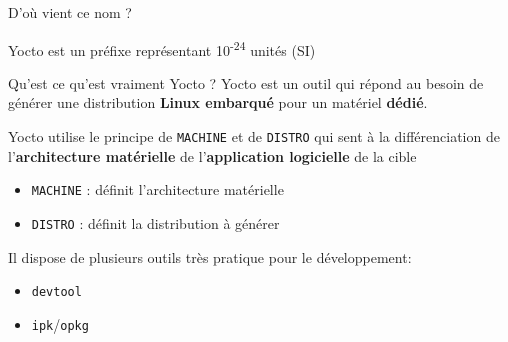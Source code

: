 \documentclass[compress]{beamer}
\begin{document}
\begin{frame}{D'où vient ce nom ?}
\begin{definition}
	Yocto est un préfixe représentant 10\textsuperscript{-24} unités (SI)
\end{definition}
\end{frame}

\begin{frame}
\begin{block}{Qu'est ce qu'est vraiment Yocto ?}
	Yocto est un outil qui répond au besoin de générer une distribution
	\textbf{Linux embarqué} pour un matériel \textbf{dédié}.
\end{block}
\end{frame}

\begin{frame}
Yocto utilise le principe de \texttt{MACHINE} et de \texttt{DISTRO} qui sent à la différenciation de l’\textbf{architecture matérielle} de l’\textbf{application logicielle} de la cible
\begin{itemize}
	\item \texttt{MACHINE} : définit l’architecture matérielle
	\item \texttt{DISTRO} : définit la distribution à générer
\end{itemize}
Il dispose de plusieurs outils très pratique pour le développement:
\begin{itemize}
	\item \texttt{devtool}
	\item \texttt{ipk}/\texttt{opkg}
\end{itemize}
\end{frame}
\end{document}
